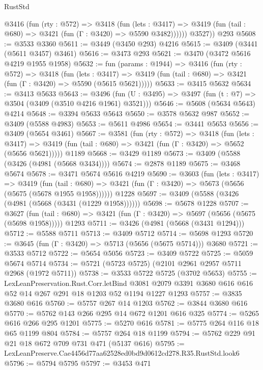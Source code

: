 \begin{lexlean}{RustStd}
\begin{coremodule}
          @3416
            (fun (rty : @572) =>
            @3418
              (fun (lets : @3417) =>
              @3419 (fun (tail : @680) => @3421 (fun (Γ : @3420) => @5590 @3482))))))
        @3527))
    @293
@5608 := @3533 @3360
@5611 := @3449 (@3450 @293) @4216
@5615 := @3409 (@3441 (@5611 @3457) @3461)
@5616 := @3473 @293
@5621 := @3470 (@3472 @5616 @4219 @1955 @1958)
@5632 := fun (params : @1944) =>
  @3416
    (fun (rty : @572) =>
    @3418
      (fun (lets : @3417) =>
      @3419 (fun (tail : @680) => @3421 (fun (Γ : @3420) => @5590 (@5615 @5621)))))
@5633 := @3415 @5632
@5634 := @3413 @5633
@5643 := @3496 (fun (U : @3495) => @3497 (fun (t : @7) => @3504 (@3409 (@3510 @4216 @1961) @3521)))
@5646 := @5608 (@5634 @5643) @4214
@5648 := @3394 @5633 @5643
@5650 := @3578 @5632 @987
@5652 := @3409 (@5588 @4983)
@5653 := @5611 @4986
@5654 := @3441 @5653
@5656 := @3409 (@5654 @3461)
@5667 := @3581
    (fun (rty : @572) =>
    @3418
      (fun (lets : @3417) =>
      @3419 (fun (tail : @680) => @3421 (fun (Γ : @3420) => @5652 (@5656 @5621)))))
    @1189
@5668 := @3429 @1189
@5673 := @3409 (@5588 (@3426 (@4981 (@5668 @3434))))
@5674 := @2878 @1189
@5675 := @3468 @5674
@5678 := @3471 @5674 @5616 @4219
@5690 := @3603
    (fun (lets : @3417) =>
    @3419
      (fun (tail : @680) => @3421 (fun (Γ : @3420) => @5673 (@5656 (@5675 (@5678 @1955 @1958))))))
    @1228
@5697 := @3409 (@5588 (@3426 (@4981 (@5668 (@3431 (@1229 @1958))))))
@5698 := @5678 @1228
@5707 := @3627
    (fun (tail : @680) => @3421 (fun (Γ : @3420) => @5697 (@5656 (@5675 (@5698 @1958)))))
    @1293
@5711 := @3426 (@4981 (@5668 (@3431 @1294)))
@5712 := @5588 @5711
@5713 := @3409 @5712
@5714 := @5698 @1293
@5720 := @3645 (fun (Γ : @3420) => @5713 (@5656 (@5675 @5714))) @3680
@5721 := @3533 @5712
@5722 := @5654 @5056
@5723 := @3409 @5722
@5725 := @5059 @5674 @5714
@5734 := @5721 (@5723 @5725) (@2101 @2961 @2957 @5711 @2968 (@1972 @5711))
@5738 := @3533 @5722 @5725 (@3702 @5653)
@5755 := LexLeanPreservation.Rust.Corr.letBind
    @3081
    @2079
    @3391
    @3680
    @616
    @616
    @52
    @14
    @267
    @291
    @18
    @1203
    @52
    @1194
    @1227
    @1293
@5757 := @3835 @3680 @616
@5760 := @5757 @267 @14 @1203
@5762 := @3844 @3680 @616
@5770 := @5762 @143 @266 @295 @14 @672 @1201 @616 @325
@5774 := @5265 @616 @266 @295 @1201
@5775 := @5270 @616
@5781 := @5775 @264 @116 @18 @65 @1199 @804
@5784 := @5757 @264 @18 @1199
@5794 := @5762 @229 @91 @21 @18 @672 @709 @731 @471 (@5137 @616)
@5795 := LexLeanPreserve.Cae4456d77aa62528ed0bd9d0612cd278.R35.RustStd.look6
@5796 := @5794 @5795
@5797 := @3453 @471

\end{coremodule}
\end{lexlean}
